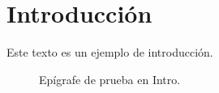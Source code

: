   \section{Introducción}

  Este texto es un ejemplo de introducción.

  \begin{figure}[htb]
      \centering
      \caption{Epígrafe de prueba en Intro.}
      \label{fig:IntroImage}
  \end{figure}
